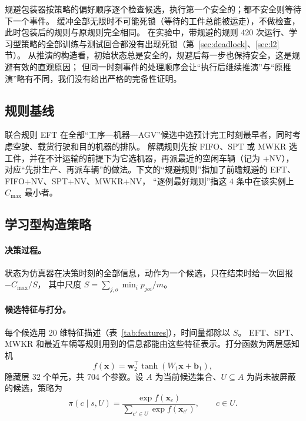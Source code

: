 \documentclass[11pt,a4paper]{ctexart}
\theoremstyle{definition}
\theoremstyle{remark}
\begin{document}
规避包装器按策略的偏好顺序逐个检查候选，执行第一个安全的；都不安全则等待下一个事件。
缓冲全部无限时不可能死锁（等待的工件总能被运走），不做检查，此时包装后的规则与原规则完全相同。
在实验中，带规避的规则 420 次运行、学习型策略的全部训练与测试回合都没有出现死锁（第~\ref{sec:deadlock}、\ref{sec:l2} 节）。
从推演的构造看，初始状态总是安全的，规避后每一步也保持安全，这是规避有效的直观原因；
但同一时刻事件的处理顺序会让“执行后继续推演”与“原推演”略有不同，我们没有给出严格的完备性证明。

\subsection{规则基线}

联合规则 EFT 在全部“工序—机器—AGV”候选中选预计完工时刻最早者，同时考虑空驶、载货行驶和目的机器的排队。
解耦规则先按 FIFO、SPT 或 MWKR 选工件，并在不计运输的前提下为它选机器，再派最近的空闲车辆（记为 +NV），
对应“先排生产、再派车辆”的做法。下文的“规避规则”指加了前瞻规避的 EFT、FIFO+NV、SPT+NV、MWKR+NV，
“逐例最好规则”指这 4 条中在该实例上 $C_{\max}$ 最小者。

\subsection{学习型构造策略}

\paragraph{决策过程。}状态为仿真器在决策时刻的全部信息，动作为一个候选，只在结束时给一次回报 $-C_{\max}/S$，
其中尺度 $S=\sum_{j,o}\min_i p_{joi}/m$。

\paragraph{候选特征与打分。}每个候选用 20 维特征描述（表~\ref{tab:features}），时间量都除以 $S$。
EFT、SPT、MWKR 和最近车辆等规则用到的信息都能由这些特征表示。打分函数为两层感知机
\begin{equation}
f(\boldsymbol{x})=\boldsymbol{w}_2^{\top}\tanh(W_1\boldsymbol{x}+\boldsymbol{b}_1),
\end{equation}
隐藏层 32 个单元，共 704 个参数。设 $A$ 为当前候选集合、$U\subseteq A$ 为尚未被屏蔽的候选，策略为
\begin{equation}
\pi(c\mid s,U)=\frac{\exp f(\boldsymbol{x}_c)}{\sum_{c'\in U}\exp f(\boldsymbol{x}_{c'})},\qquad c\in U.
\end{equation}
\end{document}
